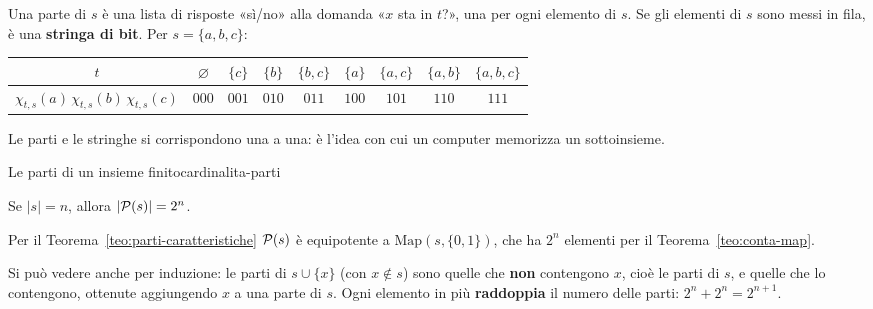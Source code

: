 \begin{spiegazione}
    Una parte di $s$ è una lista di risposte «sì/no» alla domanda «$x$ sta in $t$?», una per ogni elemento di $s$. Se gli elementi
    di $s$ sono messi in fila, è una \textbf{stringa di bit}. Per $s = \{a, b, c\}$:
    \begin{center}
    \renewcommand{\arraystretch}{1.2}
    \begin{tabular}{c|cccccccc}
        $t$ & $\varnothing$ & $\{c\}$ & $\{b\}$ & $\{b, c\}$ & $\{a\}$ & $\{a, c\}$ & $\{a, b\}$ & $\{a, b, c\}$ \\ \hline
        $\chi_{t, s}(a)\,\chi_{t, s}(b)\,\chi_{t, s}(c)$ & $000$ & $001$ & $010$ & $011$ & $100$ & $101$ & $110$ & $111$ \\
    \end{tabular}
    \end{center}
    Le parti e le stringhe si corrispondono una a una: è l'idea con cui un computer memorizza un sottoinsieme.
\end{spiegazione}

\begin{concetto}
\begin{Corollario}{Le parti di un insieme finito}{cardinalita-parti}
    \begin{prerequisiti}
    \end{prerequisiti}
    Se $|s| = n$, allora $|\mathcal{P}(s)| = 2^n$.
\end{Corollario}
\begin{dimostrazione}
    Per il Teorema~\ref{teo:parti-caratteristiche} $\mathcal{P}(s)$ è equipotente a $\mathrm{Map}(s, \{0, 1\})$, che ha $2^n$ elementi per il
    Teorema~\ref{teo:conta-map}.
\end{dimostrazione}
\end{concetto}

\begin{spiegazione}
    Si può vedere anche per induzione: le parti di $s \cup \{x\}$ (con $x \notin s$) sono quelle che \textbf{non} contengono $x$, cioè le
    parti di $s$, e quelle che lo contengono, ottenute aggiungendo $x$ a una parte di $s$. Ogni elemento in più \textbf{raddoppia} il
    numero delle parti: $2^n + 2^n = 2^{n + 1}$.
    \begin{center}
    \end{center}
\end{spiegazione}

